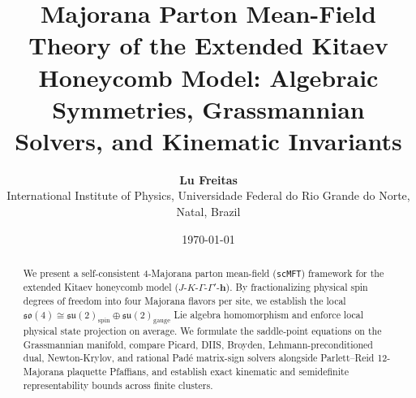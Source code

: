 \documentclass[11pt,a4paper]{article}
\title{\textbf{Majorana Parton Mean-Field Theory of the Extended Kitaev Honeycomb Model: Algebraic Symmetries, Grassmannian Solvers, and Kinematic Invariants}}
\author{\textbf{Lu Freitas}\\[1mm]
\small International Institute of Physics, Universidade Federal do Rio Grande do Norte, Natal, Brazil}
\date{\today}
\begin{document}
\maketitle

\begin{abstract}
We present a self-consistent 4-Majorana parton mean-field (\texttt{scMFT}) framework for the extended Kitaev honeycomb model ($J\text{-}K\text{-}\Gamma\text{-}\Gamma'\text{-}\mathbf{h}$). By fractionalizing physical spin degrees of freedom into four Majorana flavors per site, we establish the local $\mathfrak{so}(4) \cong \mathfrak{su}(2)_{\mathrm{spin}} \oplus \mathfrak{su}(2)_{\mathrm{gauge}}$ Lie algebra homomorphism and enforce local physical state projection on average. We formulate the saddle-point equations on the Grassmannian manifold, compare Picard, DIIS, Broyden, Lehmann-preconditioned dual, Newton-Krylov, and rational Pad\'e matrix-sign solvers alongside Parlett--Reid 12-Majorana plaquette Pfaffians, and establish exact kinematic and semidefinite representability bounds across finite clusters.
\end{abstract}

\tableofcontents
\newpage









\end{document}
